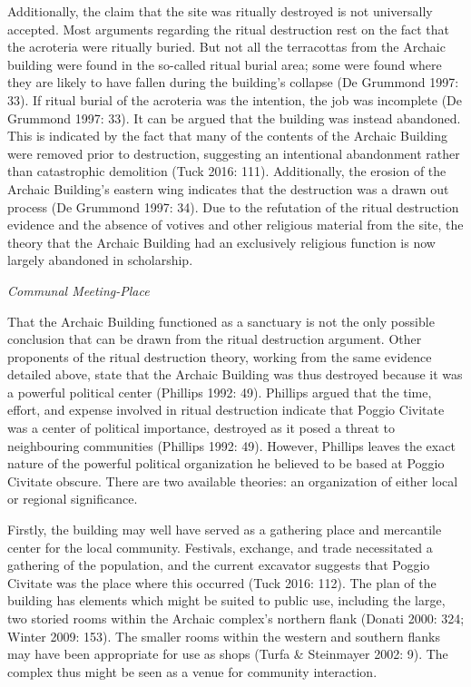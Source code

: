 Additionally, the claim that the site was ritually destroyed is not
universally accepted. Most arguments regarding the ritual destruction
rest on the fact that the acroteria were ritually buried. But not all
the terracottas from the Archaic building were found in the so-called
ritual burial area; some were found where they are likely to have fallen
during the building's collapse (De Grummond 1997: 33). If ritual burial
of the acroteria was the intention, the job was incomplete (De Grummond
1997: 33). It can be argued that the building was instead abandoned.
This is indicated by the fact that many of the contents of the Archaic
Building were removed prior to destruction, suggesting an intentional
abandonment rather than catastrophic demolition (Tuck 2016: 111).
Additionally, the erosion of the Archaic Building's eastern wing
indicates that the destruction was a drawn out process (De Grummond
1997: 34). Due to the refutation of the ritual destruction evidence and
the absence of votives and other religious material from the site, the
theory that the Archaic Building had an exclusively religious function
is now largely abandoned in scholarship.

\emph{Communal Meeting-Place}

That the Archaic Building functioned as a sanctuary is not the only
possible conclusion that can be drawn from the ritual destruction
argument. Other proponents of the ritual destruction theory, working
from the same evidence detailed above, state that the Archaic Building
was thus destroyed because it was a powerful political center (Phillips
1992: 49). Phillips argued that the time, effort, and expense involved
in ritual destruction indicate that Poggio Civitate was a center of
political importance, destroyed as it posed a threat to neighbouring
communities (Phillips 1992: 49). However, Phillips leaves the exact
nature of the powerful political organization he believed to be based at
Poggio Civitate obscure. There are two available theories: an
organization of either local or regional significance.

Firstly, the building may well have served as a gathering place and
mercantile center for the local community. Festivals, exchange, and
trade necessitated a gathering of the population, and the current
excavator suggests that Poggio Civitate was the place where this
occurred (Tuck 2016: 112). The plan of the building has elements which
might be suited to public use, including the large, two storied rooms
within the Archaic complex's northern flank (Donati 2000: 324; Winter
2009: 153). The smaller rooms within the western and southern flanks may
have been appropriate for use as shops (Turfa \& Steinmayer 2002: 9).
The complex thus might be seen as a venue for community interaction.


